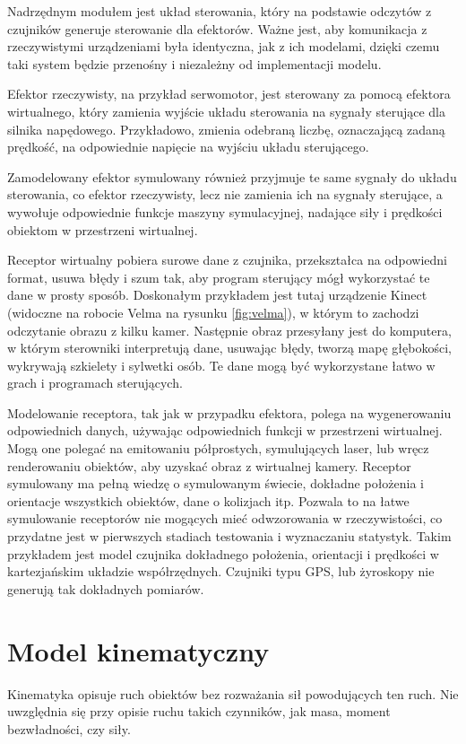 	Nadrzędnym modułem jest układ sterowania, który na podstawie odczytów z czujników generuje sterowanie dla efektorów.
	Ważne jest, aby komunikacja z rzeczywistymi urządzeniami była identyczna, jak z ich modelami, dzięki czemu taki system będzie przenośny i niezależny od implementacji modelu.

	Efektor rzeczywisty, na przykład serwomotor, jest sterowany za pomocą efektora wirtualnego, który zamienia wyjście układu sterowania na sygnały sterujące dla silnika napędowego.
	Przykładowo, zmienia odebraną liczbę, oznaczającą zadaną prędkość, na odpowiednie napięcie na wyjściu układu sterującego.

	Zamodelowany efektor symulowany również przyjmuje te same sygnały do układu sterowania, co efektor rzeczywisty, 
	lecz nie zamienia ich na sygnały sterujące, a wywołuje odpowiednie funkcje maszyny symulacyjnej, nadające siły i prędkości obiektom w przestrzeni wirtualnej.

	Receptor wirtualny pobiera surowe dane z czujnika, przekształca na odpowiedni format, usuwa błędy i szum tak, aby program sterujący mógł wykorzystać te dane w prosty sposób. 
	Doskonałym przykładem jest tutaj urządzenie Kinect (widoczne na robocie Velma na rysunku \ref{fig:velma}), w którym to zachodzi odczytanie obrazu z kilku kamer.
	Następnie obraz przesyłany jest do komputera, w którym sterowniki interpretują dane, usuwając błędy, tworzą mapę głębokości, wykrywają szkielety i sylwetki osób.
	Te dane mogą być wykorzystane łatwo w grach i programach sterujących.

	Modelowanie receptora, tak jak w przypadku efektora, polega na wygenerowaniu odpowiednich danych, używając odpowiednich funkcji w przestrzeni wirtualnej.
	Mogą one polegać na emitowaniu półprostych, symulujących laser, lub wręcz renderowaniu obiektów, aby uzyskać obraz z wirtualnej kamery.
	Receptor symulowany ma pełną wiedzę o symulowanym świecie, dokładne położenia i orientacje wszystkich obiektów, dane o kolizjach itp. 
	Pozwala to na łatwe symulowanie receptorów nie mogących mieć odwzorowania w rzeczywistości, co przydatne jest w pierwszych stadiach testowania i wyznaczaniu statystyk.
	Takim przykładem jest model czujnika dokładnego położenia, orientacji i prędkości w kartezjańskim układzie współrzędnych. 
	Czujniki typu GPS, lub żyroskopy nie generują tak dokładnych pomiarów.


\section{Model kinematyczny}
	\label{sec:pseudovelma}
	Kinematyka opisuje ruch obiektów bez rozważania sił powodujących ten ruch.
	Nie uwzględnia się przy opisie ruchu takich czynników, jak masa, moment bezwładności, czy siły.
	
